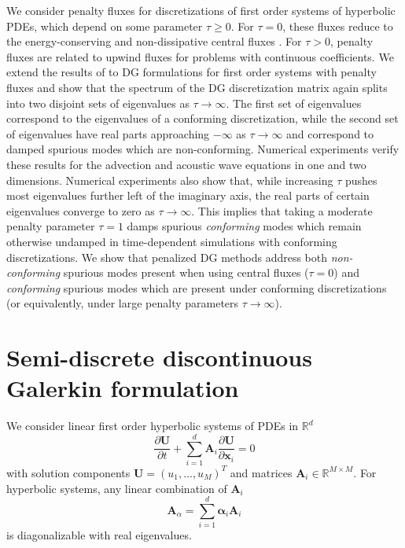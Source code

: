 \documentclass[preprint,10pt]{elsarticle}
\newcommand{\pd}[2]{\frac{\partial#1}{\partial#2}}
\newcommand{\note}[1]{{\color{blue}#1}}
\begin{document}
We consider penalty fluxes for discretizations of first order systems of hyperbolic PDEs, which depend on some parameter $\tau \geq 0$.  For $\tau = 0$, these fluxes reduce to the energy-conserving and non-dissipative central fluxes \cite{fezoui2005convergence}.  For $\tau > 0$, penalty fluxes are related to upwind fluxes for problems with continuous coefficients.  We extend the results of \cite{Warburton20063205} to DG formulations for first order systems with penalty fluxes and show that the \note{spectrum} of the DG discretization matrix again splits into two disjoint sets of eigenvalues as $\tau\rightarrow\infty$.  The first set of eigenvalues correspond to the eigenvalues of a conforming discretization, while the second set of eigenvalues have real parts approaching $-\infty$ as $\tau\rightarrow \infty$ and correspond to damped spurious modes \note{which are non-conforming}.  Numerical experiments verify these results for the advection and acoustic wave equations in one and two dimensions.  Numerical experiments also show that, while increasing $\tau$ pushes most eigenvalues further left of the imaginary axis, the real parts of certain eigenvalues converge to zero as $\tau\rightarrow\infty$.  This implies that taking a moderate penalty parameter $\tau = 1$ damps spurious \note{\emph{conforming}} modes which remain otherwise undamped in time-dependent simulations with conforming discretizations.  \note{We show that penalized DG methods address both \textit{non-conforming} spurious modes present when using central fluxes ($\tau = 0$) and \textit{conforming} spurious modes which are present under conforming discretizations (or equivalently, under large penalty parameters $\tau \rightarrow \infty$).}  

\section{Semi-discrete discontinuous Galerkin formulation}

We consider linear first order hyperbolic systems of PDEs in $\mathbb{R}^d$
\begin{equation}
\pd{\bm{U}}{t} + \sum_{i=1}^d \bm{A}_i\pd{{\bm{U}}}{\bm{x}_i} = 0
\label{eq:cons}
\end{equation}
with solution components $\bm{U} = (u_1, \ldots, u_M)^T$ and matrices $\bm{A}_i \in \mathbb{R}^{M\times M}$.  
\note{
For hyperbolic systems, any linear combination of $\bm{A}_i$ 
\begin{equation}
\bm{A}_{\alpha} = \sum_{i=1}^d \bm{\alpha}_i \bm{A}_i
\label{eq:hyperbolic}
\end{equation}
is diagonalizable with real eigenvalues.  
}
\end{document}
